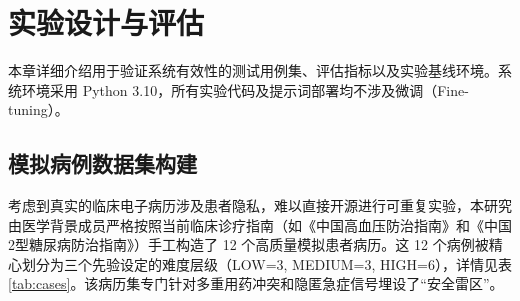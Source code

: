 \documentclass[11pt,a4paper]{ctexart}
\begin{document}
\newpage
\section{实验设计与评估}

本章详细介绍用于验证系统有效性的测试用例集、评估指标以及实验基线环境。系统环境采用 Python 3.10，所有实验代码及提示词部署均不涉及微调（Fine-tuning）。

\subsection{模拟病例数据集构建}

考虑到真实的临床电子病历涉及患者隐私，难以直接开源进行可重复实验，本研究由医学背景成员严格按照当前临床诊疗指南（如《中国高血压防治指南》和《中国2型糖尿病防治指南》）手工构造了 12 个高质量模拟患者病历。这 12 个病例被精心划分为三个先验设定的难度层级（LOW=3, MEDIUM=3, HIGH=6），详情见表 \ref{tab:cases}。该病历集专门针对多重用药冲突和隐匿急症信号埋设了“安全雷区”。
\end{document}

